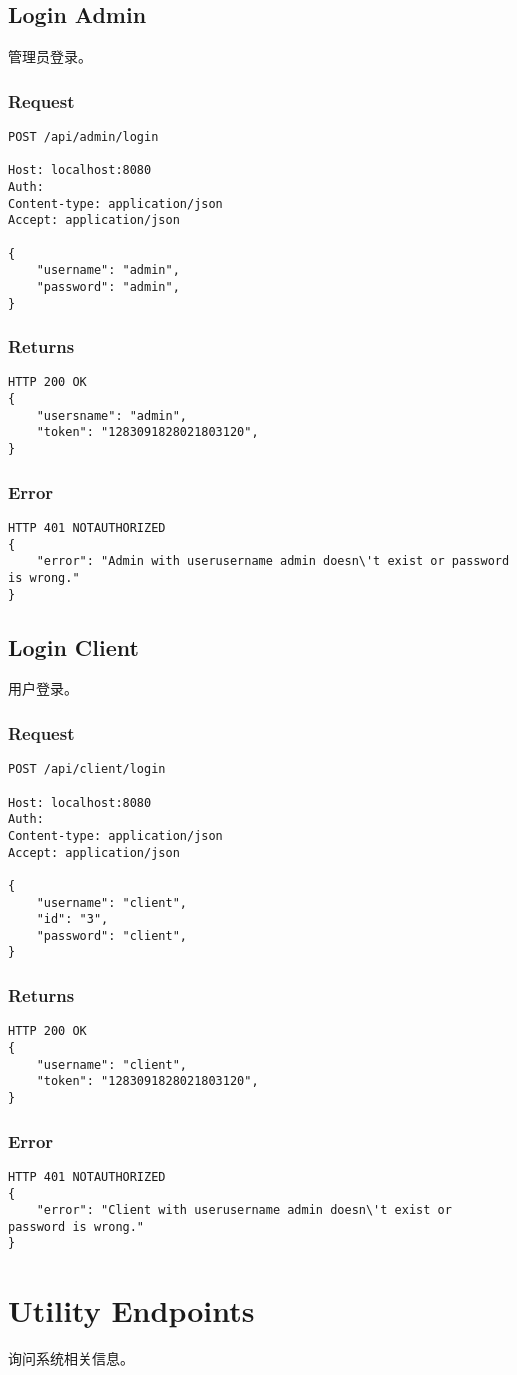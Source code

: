 \documentclass{article}
\begin{document}
\subsection{Login Admin}
管理员登录。

\subsubsection*{Request}
\begin{lstlisting}
POST /api/admin/login

Host: localhost:8080
Auth:
Content-type: application/json
Accept: application/json

{
    "username": "admin",
    "password": "admin",
}
\end{lstlisting}

\subsubsection*{Returns}
\begin{lstlisting}
HTTP 200 OK
{
    "usersname": "admin",
    "token": "1283091828021803120",
}

\end{lstlisting}

\subsubsection*{Error}
\begin{lstlisting}
HTTP 401 NOTAUTHORIZED
{
    "error": "Admin with userusername admin doesn\'t exist or password is wrong."
}
\end{lstlisting}

\subsection{Login Client}
用户登录。

\subsubsection*{Request}
\begin{lstlisting}
POST /api/client/login

Host: localhost:8080
Auth:
Content-type: application/json
Accept: application/json

{
    "username": "client",
    "id": "3",
    "password": "client",
}
\end{lstlisting}

\subsubsection*{Returns}
\begin{lstlisting}
HTTP 200 OK
{
    "username": "client",
    "token": "1283091828021803120",
}

\end{lstlisting}

\subsubsection*{Error}
\begin{lstlisting}
HTTP 401 NOTAUTHORIZED
{
    "error": "Client with userusername admin doesn\'t exist or password is wrong."
}
\end{lstlisting}

\section{Utility Endpoints}
询问系统相关信息。
\end{document}
